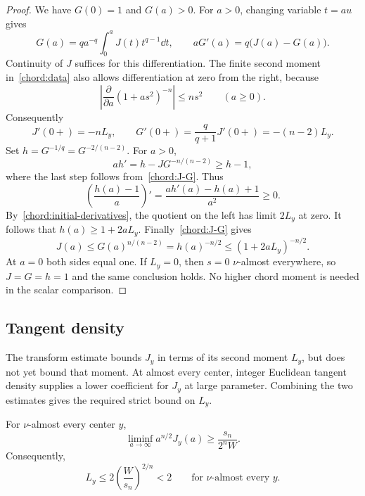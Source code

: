 \begin{proof}
We have $G(0)=1$ and $G(a)>0$. For $a>0$, changing variable
$t=au$ gives
\[
 G(a)=q a^{-q}\int_0^a J(t)t^{q-1}\dd t,
 \qquad aG'(a)=q\bigl(J(a)-G(a)\bigr).
\]
Continuity of $J$ suffices for this differentiation. The finite
second moment in~\eqref{chord:data} also allows differentiation
at zero from the right, because
\[
 \left|\frac{\partial}{\partial a}(1+as^2)^{-n}\right|
                 \le ns^2\qquad(a\ge0).
\]
Consequently
\begin{equation}\label{chord:initial-derivatives}
 J'(0+)=-nL_y,
 \qquad G'(0+)=\frac{q}{q+1}J'(0+)=-(n-2)L_y.
\end{equation}
Set $h=G^{-1/q}=G^{-2/(n-2)}$. For $a>0$,
\[
 ah'=h-JG^{-n/(n-2)}\ge h-1,
\]
where the last step follows from~\eqref{chord:J-G}. Thus
\[
 \left(\frac{h(a)-1}{a}\right)'
       =\frac{ah'(a)-h(a)+1}{a^2}\ge0.
\]
By~\eqref{chord:initial-derivatives}, the quotient on the left
has limit $2L_y$ at zero. It follows that
$h(a)\ge1+2aL_y$. Finally~\eqref{chord:J-G} gives
\[
 J(a)\le G(a)^{n/(n-2)}=h(a)^{-n/2}
                          \le(1+2aL_y)^{-n/2}.
\]
At $a=0$ both sides equal one. If $L_y=0$, then $s=0$
$\nu$-almost everywhere, so $J=G=h=1$ and the same conclusion
holds. No higher chord moment is needed in the scalar comparison.
\end{proof}

\subsection{Tangent density}

The transform estimate bounds $J_y$ in terms of its second moment
$L_y$, but does not yet bound that moment. At almost every center,
integer Euclidean tangent density supplies a lower coefficient for
$J_y$ at large parameter. Combining the two estimates gives the
required strict bound on $L_y$.

\begin{lemma}\label{lem:chord-density}
For $\nu$-almost every center $y$,
\begin{equation}\label{chord:transform-density}
 \liminf_{a\to\infty}a^{n/2}J_y(a)
                         \ge\frac{s_n}{2^nW}.
\end{equation}
Consequently,
\begin{equation}\label{eq:chord-upper}
 L_y\le2\left(\frac{W}{s_n}\right)^{2/n}<2
                    \qquad\text{for $\nu$-almost every }y.
\end{equation}
\end{lemma}

